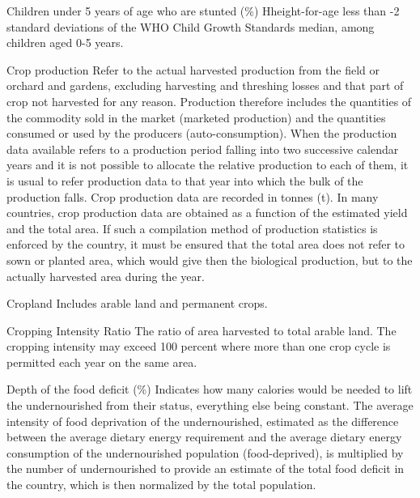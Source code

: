 \begin{MetadataCollection} {}
\begin{metadata}{Children under 5 years of age who are stunted (\%)} {}
Hheight-for-age less than -2 standard deviations of the WHO Child Growth Standards median, among children aged 0-5 years.
\end{metadata}

\begin{metadata}{Crop production} {}
Refer to the actual harvested production from the field or orchard and gardens, excluding harvesting and threshing losses and that part of crop not harvested for any reason. Production therefore includes the quantities of the commodity sold in the market (marketed production) and the quantities consumed or used by the producers (auto-consumption). When the production data available refers to a production period falling into two successive calendar years and it is not possible to allocate the relative production to each of them, it is usual to refer production data to that year into which the bulk of the production falls. Crop production data are recorded in tonnes (t). In many countries, crop production data are obtained as a function of the estimated yield and the total area. If such a compilation method of production statistics is enforced by the country, it must be ensured that the total area does not refer to sown or planted area, which would give then the biological production, but to the actually harvested area during the year.
\end{metadata}

\begin{metadata}{Cropland} {}
Includes arable land and permanent crops.
\end{metadata}

\begin{metadata}{Cropping Intensity Ratio} {}
The ratio of area harvested to total arable land. The cropping intensity may exceed 100 percent where more than one crop cycle is permitted each year on the same area.
\end{metadata}

\begin{metadata}{Depth of the food deficit (\%)} {}
Indicates how many calories would be needed to lift the undernourished from their status, everything else being constant. The average intensity of food deprivation of the undernourished, estimated as the difference between the average dietary energy requirement and the average dietary energy consumption of the undernourished population (food-deprived), is multiplied by the number of undernourished to provide an estimate of the total food deficit in the country, which is then normalized by the total population.
\end{metadata}


\end{MetadataCollection}

